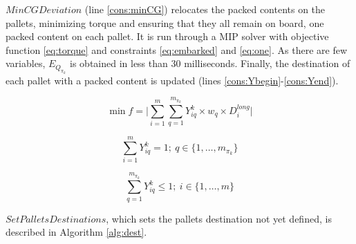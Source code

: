 \documentclass[preprint]{elsarticle}
\begin{document}
$MinCGDeviation$\/ (line \ref{cons:minCG}) relocates the packed contents on the pallets, minimizing torque and ensuring that they all remain on board, one packed content on each pallet. It is run through a MIP solver with objective function \ref{eq:torque} and constraints \ref{eq:embarked} and \ref{eq:one}. As there are few variables, $E_{Q_{\pi_k}}$\/ is obtained in less than $30$\/ milliseconds. Finally, the destination of each pallet with a packed content is updated (lines \ref{cons:Ybegin}-\ref{cons:Yend}).

\begin{equation} \label{eq:torque}
	\min f =  \Big | \sum_{i=1}^{m} \sum_{q=1}^{m_{\pi_k}} Y^k_{iq} \times w_q \times D_i^{long}  \Big |
\end{equation}

\begin{equation} \label{eq:embarked}
	\sum_{i=1}^{m} Y^k_{iq} = 1;\ q \in \{1,\ldots,m_{\pi_k}\}
\end{equation}

\begin{equation} \label{eq:one}
	\sum_{q=1}^{m_{\pi_k}} Y^k_{iq} \leq 1;\ i \in \{1,\ldots,m\}
\end{equation}


$SetPalletsDestinations$, which sets the pallets destination not yet defined, is described in Algorithm \ref{alg:dest}.
\end{document}
